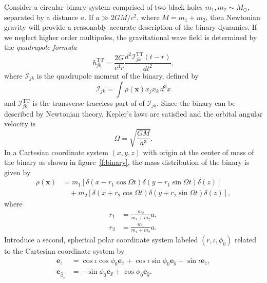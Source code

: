 Consider a circular binary system comprised of two black holes $m_1, m_2 \sim
M_\odot$, separated by a distance $a$. If $a \gg 2GM/c^2$, where $M = m_1 +
m_2$, then Newtonian gravity will provide a reasonably accurate description of
the binary dynamics.  If we neglect higher order multipoles, the gravitational
wave field is determined by the \emph{quadrupole formula}\cite{MTW73}
\begin{equation}
h_{jk}^\mathrm{TT} = 
\frac{2G}{c^4r} \frac{d^2 \mathcal{I}_{jk}^\mathrm{TT}(t - r)}{dt^2},
\label{eq:quadrupole}
\end{equation}
where $\mathcal{I}_{jk}$ is the quadrupole moment of the binary, defined by
\begin{equation}
\mathcal{I}_{jk} =
\int \rho(\boldsymbol{x})x_j x_k\,d^3 x
\label{eq:massquad}
\end{equation}
and $\mathcal{I}_{jk}^\mathrm{TT}$ is the transverse traceless part of of
$\mathcal{I}_{jk}$. Since the binary can be described by Newtonian theory,
Kepler's laws are satisfied and the orbital angular velocity is
\begin{equation}
\Omega = \sqrt{\frac{GM}{a^3}}.
\end{equation}
In a Cartesian coordinate system $(x,y,z)$ with origin at
the center of mass of the binary as shown in figure~\ref{f:binary},
the mass distribution of the binary is given by
\begin{equation}
\begin{split}
\rho(\boldsymbol{x}) &=
m_1\left[\delta(x - r_1 \cos\Omega t) \delta(y - r_1 \sin\Omega
t)\delta(z)\right] \\
&\quad +
m_2\left[\delta(x + r_2 \cos\Omega t) \delta(y + r_2 \sin\Omega
t)\delta(z)\right],
\label{eq:binarymassdist}
\end{split}
\end{equation}
where
\begin{align}
r_1 &= \frac{m_2}{m_1 + m_2} a, \\
r_2 &= \frac{m_1}{m_1 + m_2} a.
\end{align}
Introduce a second, spherical polar coordinate system labeled
$(r,\iota,\phi_0)$ related to the Cartesian coordinate system by
\begin{align}
\boldsymbol{e}_{\hat{\iota}} &= 
\cos \iota \cos \phi_0 \boldsymbol{e}_{\hat{x}} 
+ \cos \iota \sin \phi_0 \boldsymbol{e}_{\hat{y}} 
- \sin \iota \boldsymbol{e}_{\hat{z}}, \\
\boldsymbol{e}_{\hat{\phi}_c} &= 
- \sin \phi_0 \boldsymbol{e}_{\hat{x}} 
+ \cos \phi_0 \boldsymbol{e}_{\hat{y}}.
\end{align}
